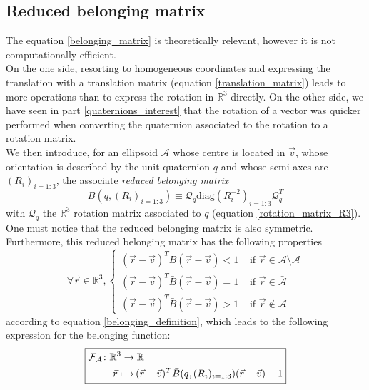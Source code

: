 \documentclass[class=report, float=false, crop=false]{standalone}
\begin{document}
\subsection{Reduced belonging matrix}

The equation \ref{belonging_matrix} is theoretically relevant, however it is not computationally efficient.\\

On the one side, resorting to homogeneous coordinates and expressing the translation with a translation matrix (equation \ref{translation_matrix}) leads to more operations than to express the rotation in $\mathbb{R}^3$ directly. On the other side, we have seen in part \ref{quaternions_interest} that the rotation of a vector was quicker performed when converting the quaternion associated to the rotation to a rotation matrix.\\

We then introduce, for an ellipsoid $\mathcal{A}$ whose centre is located in $\vec{v}$, whose orientation is described by the unit quaternion $q$ and whose semi-axes are $(R_i)_{i=1:3}$, the associate \textit{reduced belonging matrix}
\begin{equation}
\boxed{\bar{B}(q,(R_i)_{i=1:3}) \equiv \mathcal{Q}_q\text{diag}(R_i^{-2})_{i=1:3}\mathcal{Q}_q^T}
\label{reduced_belonging_matrix}
\end{equation}
with $\mathcal{Q}_q$ the $\mathbb{R}^3$ rotation matrix associated to $q$ (equation \ref{rotation_matrix_R3}). One must notice that the reduced belonging matrix is also symmetric. Furthermore, this reduced belonging matrix has the following properties
\begin{equation}
\forall \vec{r} \in \mathbb{R}^3, \begin{cases} (\vec{r} - \vec{v})^T \bar{B} (\vec{r} - \vec{v}) < 1 &\text{ if } \vec{r} \in \mathcal{A} \setminus \bar{\mathcal{A}} \\ (\vec{r} - \vec{v})^T \bar{B} (\vec{r} - \vec{v}) = 1 &\text{ if } \vec{r} \in \bar{\mathcal{A}} \\ (\vec{r} - \vec{v})^T \bar{B} (\vec{r} - \vec{v}) > 1 &\text{ if } \vec{r} \notin \mathcal{A} \end{cases}
\label{reduced_belonging_definition}
\end{equation}
according to equation \ref{belonging_definition}, which leads to the following expression for the belonging function:
\begin{equation}
\boxed{\begin{aligned}\mathcal{F}_{\mathcal{A}} \colon &\mathbb{R}^3 \to \mathbb{R}\\     &\phantomarrow{\mathbb{R}^3}{\vec{r}} (\vec{r} - \vec{v})^T\bar{B}(q,(R_i)_{i=1:3})(\vec{r}-\vec{v}) - 1\end{aligned}}
\label{belonging_function_reduced}
\end{equation}
\end{document}
